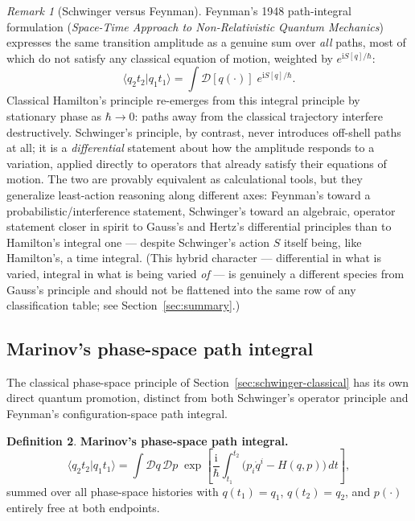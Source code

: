 \documentclass[11pt]{book}
\theoremstyle{definition}
\newtheorem{definition}{Definition}[section]
\theoremstyle{plain}
\theoremstyle{remark}
\newtheorem{remark}[definition]{Remark}
\newcommand{\ii}{\mathrm{i}}
\begin{document}
\begin{remark}[Schwinger versus Feynman]
Feynman's 1948 path-integral formulation (\emph{Space-Time Approach to Non-Relativistic Quantum Mechanics}) expresses the same transition amplitude as a genuine sum over \emph{all} paths, most of which do not satisfy any classical equation of motion, weighted by $e^{\ii S[q]/\hbar}$:
\[
\langle q_2t_2|q_1t_1\rangle = \int \mathcal D[q(\cdot)]\;e^{\ii S[q]/\hbar}.
\]
Classical Hamilton's principle re-emerges from this integral principle by stationary phase as $\hbar\to0$: paths away from the classical trajectory interfere destructively. Schwinger's principle, by contrast, never introduces off-shell paths at all; it is a \emph{differential} statement about how the amplitude responds to a variation, applied directly to operators that already satisfy their equations of motion. The two are provably equivalent as calculational tools, but they generalize least-action reasoning along different axes: Feynman's toward a probabilistic/interference statement, Schwinger's toward an algebraic, operator statement closer in spirit to Gauss's and Hertz's differential principles than to Hamilton's integral one --- despite Schwinger's action $S$ itself being, like Hamilton's, a time integral. (This hybrid character --- differential in what is varied, integral in what is being varied \emph{of} --- is genuinely a different species from Gauss's principle and should not be flattened into the same row of any classification table; see Section~\ref{sec:summary}.)
\end{remark}

\subsection{Marinov's phase-space path integral}
\label{sec:marinov}

The classical phase-space principle of Section~\ref{sec:schwinger-classical} has its own direct quantum promotion, distinct from both Schwinger's operator principle and Feynman's configuration-space path integral.

\begin{definition}
\textbf{Marinov's phase-space path integral.}
\[
\langle q_2t_2|q_1t_1\rangle = \int \mathcal Dq\,\mathcal Dp\;\exp\left[\frac{\ii}{\hbar}\int_{t_1}^{t_2}\big(p_i\dot q^i - H(q,p)\big)\,dt\right],
\]
summed over all phase-space histories with $q(t_1)=q_1$, $q(t_2)=q_2$, and $p(\cdot)$ entirely free at both endpoints.
\end{definition}
\end{document}
